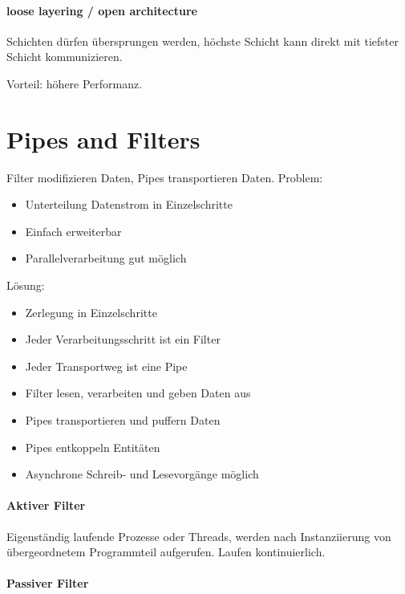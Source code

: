 \paragraph{loose layering / open
architecture}\label{loose-layering-open-architecture}

Schichten dürfen übersprungen werden, höchste Schicht kann direkt mit
tiefster Schicht kommunizieren.

Vorteil: höhere Performanz.

\section{Pipes and Filters}\label{pipes-and-filters}

Filter modifizieren Daten, Pipes transportieren Daten. Problem:

\begin{itemize}
\itemsep1pt\parskip0pt
\item
  Unterteilung Datenstrom in Einzelschritte
\item
  Einfach erweiterbar
\item
  Parallelverarbeitung gut möglich
\end{itemize}

Lösung:

\begin{itemize}
\itemsep1pt\parskip0pt
\item
  Zerlegung in Einzelschritte
\item
  Jeder Verarbeitungsschritt ist ein Filter
\item
  Jeder Transportweg ist eine Pipe
\item
  Filter lesen, verarbeiten und geben Daten aus
\item
  Pipes transportieren und puffern Daten
\item
  Pipes entkoppeln Entitäten
\item
  Asynchrone Schreib- und Lesevorgänge möglich
\end{itemize}

\paragraph{Aktiver Filter}\label{aktiver-filter}

Eigenständig laufende Prozesse oder Threads, werden nach Instanziierung
von übergeordnetem Programmteil aufgerufen. Laufen kontinuierlich.

\paragraph{Passiver Filter}\label{passiver-filter}

